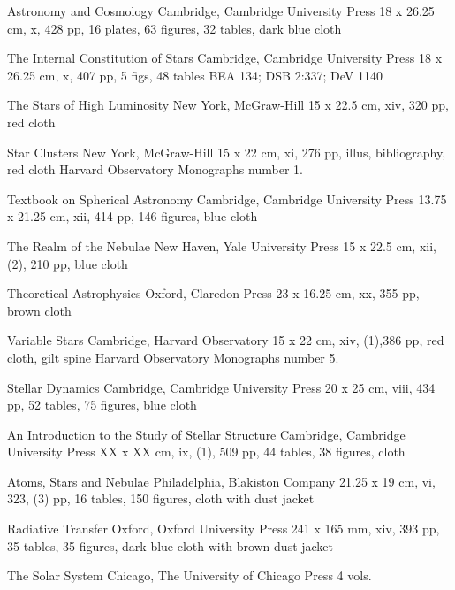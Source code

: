 {Astronomy and Cosmology}
{Cambridge, Cambridge University Press}
{18 x 26.25 cm, x, 428 pp, 16 plates, 63 figures, 32 tables, dark blue cloth}
{}

{The Internal Constitution of Stars}
{Cambridge, Cambridge University Press}
{18 x 26.25 cm, x, 407 pp, 5 figs, 48 tables}
{BEA 134; DSB 2:337; DeV 1140}

{The Stars of High Luminosity}
{New York, McGraw-Hill}
{15 x 22.5 cm, xiv, 320 pp, red cloth}
{}

{Star Clusters}
{New York, McGraw-Hill}
{15 x 22 cm, xi, 276 pp, illus, bibliography, red cloth}
{}
Harvard Observatory Monographs number 1.

{Textbook on Spherical Astronomy}
{Cambridge, Cambridge University Press}
{13.75 x 21.25 cm, xii, 414 pp, 146 figures, blue cloth}
{}

{The Realm of the Nebulae}
{New Haven, Yale University Press}
{15 x 22.5 cm, xii, (2), 210 pp, blue cloth}
{}

{Theoretical Astrophysics}
{Oxford, Claredon Press}
{23 x 16.25 cm, xx, 355 pp, brown cloth}
{}

{Variable Stars}
{Cambridge, Harvard Observatory}
{15 x 22 cm, xiv, (1),386 pp, red cloth, gilt spine}
{}
Harvard Observatory Monographs number 5.

{Stellar Dynamics}
{Cambridge, Cambridge University Press}
{20 x 25 cm, viii, 434 pp, 52 tables, 75 figures, blue cloth}
{}

{An Introduction to the Study of Stellar Structure}
{Cambridge, Cambridge University Press}
{XX x XX cm, ix, (1), 509 pp, 44 tables, 38 figures, cloth}
{}

{Atoms, Stars and Nebulae}
{Philadelphia, Blakiston Company}
{21.25 x 19 cm, vi, 323, (3) pp, 16 tables, 150 figures, cloth with dust jacket}
{}

{Radiative Transfer}
{Oxford, Oxford University Press}
{241 x 165 mm, xiv, 393 pp, 35 tables, 35 figures, dark blue cloth with brown dust jacket}
{}

{The Solar System}
{Chicago, The University of Chicago Press}
{4 vols.}
{}

